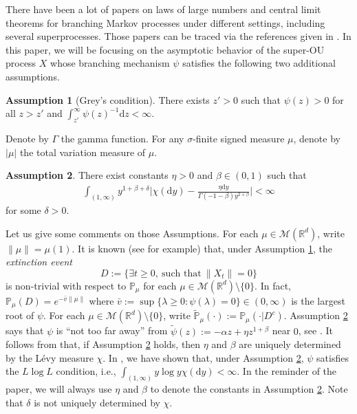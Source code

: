 \documentclass[12pt,a4paper]{amsart}
\theoremstyle{plain}
\theoremstyle{definition}
\newtheorem{asp}{Assumption}
\numberwithin{equation}{section}
\begin{document}
{\color{red}There have been a lot of papers on laws of large numbers and central limit theorems for branching Markov processes under different settings, including several superprocesses. Those papers can be traced via the references given in \cite{RenSongSunZhao2019Stable}. In this paper, we will be focusing on the asymptotic behavior of the super-OU process $X$ whose branching mechanism $\psi$ satisfies the following two additional assumptions.}

{\color{red}
\begin{asp}[Grey's condition]
	\label{asp: Greys condition}
	There exists $z' > 0$ such that $\psi(z) > 0$ for all $z>z'$ and  $\int_{z'}^\infty \psi(z)^{-1} \mathrm dz < \infty$.
\end{asp}
}
Denote by $\Gamma$ the gamma function.
For any $\sigma$-finite signed measure $\mu$, denote by $|\mu|$ the total variation measure of $\mu$.
\begin{asp}
  \label{asp: branching mechanism}
  There exist constants $\eta > 0$ and $\beta \in (0,1)$ such that
  \begin{align}
    \label{eq: asp of branching mechanism}
    \int_{(1,\infty)}y^{1+\beta +\delta}\Big|\chi(\mathrm dy)-\frac{\eta \mathrm dy}{\Gamma(-1-\beta)y^{2+\beta}}\Big| <\infty
  \end{align}
	for some $\delta > 0$.
\end{asp}

Let us give some comments on those Assumptions.
For each $\mu \in \mathcal M(\mathbb R^d)$, write $\|\mu\| = \mu(1)$.
It is known (see \cite[Theorems 12.5 \& 12.7]{Kyprianou2014Fluctuations} for example) that, under Assumption \ref{asp: Greys condition}, the \emph{extinction event}
$$D :=\{\exists t\geq 0,~\text{such that}~ \|X_t\| =0 \}$$
is non-trivial with respect to $\mathbb P_\mu$ for each  $\mu \in \mathcal M(\mathbb R^d)\setminus\{0\}$.
In fact, $ \mathbb{P}_{\mu} (D) = e^{-\bar v \|\mu\|}$ where $ \bar v := \sup\{\lambda \geq 0: \psi(\lambda) = 0\} \in (0,\infty) $ is the largest root of $\psi$. 
For each $\mu \in \mathcal M(\mathbb R^d)\setminus\{0\}$, write $\widetilde {\mathbb P}_\mu(\cdot):= \mathbb P_\mu(\cdot | D^c)$.
Assumption \ref{asp: branching mechanism} says that $\psi$ is ``not too far away'' from $\widetilde \psi(z) := - \alpha z + \eta z^{1+\beta}$ near $0$, see \cite[Remark 1.3]{RenSongSunZhao2019Stable}.
It follows from \cite[Lemma 2.2]{RenSongSunZhao2019Stable}  that, if Assumption \ref{asp: branching mechanism} holds, then $\eta$ and $\beta$ are uniquely determined by the L\'evy measure $\chi$.
In \cite[Lemma 2.3]{RenSongSunZhao2019Stable}, we have shown  that,
under Assumption \ref{asp: branching mechanism},
 $\psi$ satisfies the $L \log L$ condition, i.e., $ \int_{(1,\infty)} y\log y \chi(\mathrm dy) < \infty. $
In the reminder of the paper, we will always use $\eta$ and $\beta$ to denote the constants in Assumption  \ref{asp: branching mechanism}.
	Note that $\delta$ is not uniquely determined by $\chi$.
\end{document}
